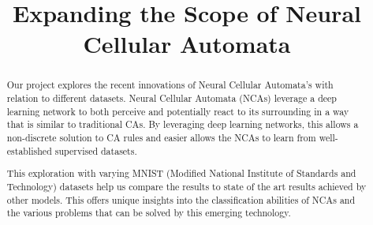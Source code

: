 \documentclass[conference]{IEEEtran}
\begin{document}
\title{Expanding the Scope of Neural Cellular Automata}

\author{
\and
{}
\and
{}
}

\maketitle

\begin{abstract}

% 
% 

Our project explores the recent innovations of Neural Cellular Automata's with relation to different datasets. Neural Cellular Automata (NCAs) leverage a deep learning network to both perceive and potentially react to its surrounding in a way that is similar to traditional CAs. By leveraging deep learning networks, this allows a non-discrete solution to CA rules and easier allows the NCAs to learn from well-established supervised datasets. 

This exploration with varying MNIST (Modified National Institute of Standards and Technology) datasets help us compare the results to state of the art results achieved by other models. This offers unique insights into the classification abilities of NCAs and the various problems that can be solved by this emerging technology.

\end{abstract}
\end{document}
